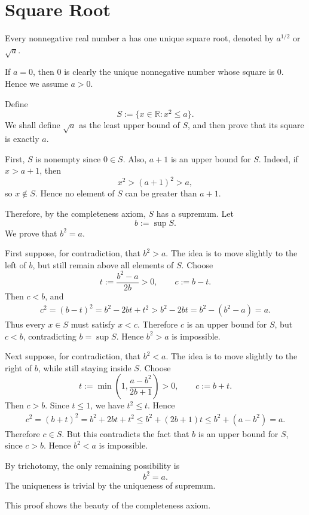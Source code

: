 	\section{Square Root}
    \begin{theoremenv}
		Every nonnegative real number a has one unique square root, denoted by $a^{1/2}$ or $\sqrt a$.
	\end{theoremenv}
	\begin{proofenv}
    If \(a=0\), then \(0\) is clearly the unique nonnegative number whose square is
    \(0\). Hence we assume \(a>0\).

    Define
    \[
    S:=\{x\in\mathbb R:x^2\le a\}.
    \]
    We shall define \(\sqrt a\) as the least upper bound of \(S\), and then prove
    that its square is exactly \(a\).

    First, \(S\) is nonempty since \(0\in S\). Also, \(a+1\) is an upper bound for
    \(S\). Indeed, if \(x>a+1\), then
    \[
    x^2>(a+1)^2>a,
    \]
    so \(x\notin S\). Hence no element of \(S\) can be greater than \(a+1\).

    Therefore, by the completeness axiom, \(S\) has a supremum. Let
    \[
    b:=\sup S.
    \]
    We prove that \(b^2=a\).

    First suppose, for contradiction, that \(b^2>a\). The idea is to move slightly
    to the left of \(b\), but still remain above all elements of \(S\). Choose
    \[
    t:=\frac{b^2-a}{2b}>0,
    \qquad
    c:=b-t.
    \]
    Then \(c<b\), and
    \begin{align*}
    c^2
    =(b-t)^2 
    =b^2-2bt+t^2 
    > b^2-2bt 
    =b^2-(b^2-a) 
    =a.
    \end{align*}
    Thus every \(x\in S\) must satisfy \(x<c\). Therefore \(c\) is an upper bound
    for \(S\), but \(c<b\), contradicting \(b=\sup S\). Hence \(b^2>a\) is
    impossible.

    Next suppose, for contradiction, that \(b^2<a\). The idea is to move slightly
    to the right of \(b\), while still staying inside \(S\). Choose
    \[
    t:=\min\left(1,\frac{a-b^2}{2b+1}\right)>0,
    \qquad
    c:=b+t.
    \]
    Then \(c>b\). Since \(t\le1\), we have \(t^2\le t\). Hence
    \begin{align*}
    c^2
    =(b+t)^2 
    =b^2+2bt+t^2 
    \le b^2+(2b+1)t 
    \le b^2+(a-b^2) 
    =a.
    \end{align*}
    Therefore \(c\in S\). But this contradicts the fact that \(b\) is an upper
    bound for \(S\), since \(c>b\). Hence \(b^2<a\) is impossible.

    By trichotomy, the only remaining possibility is
    \[
    b^2=a.
    \]
    The uniqueness is trivial by the uniqueness of supremum.
    \end{proofenv}
	\begin{remarkenv}
		This proof shows the beauty of the completeness axiom.
	\end{remarkenv}

